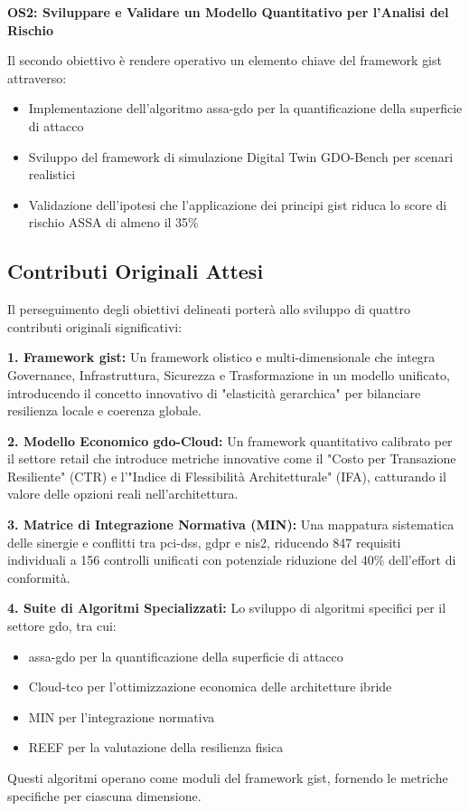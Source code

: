 \textbf{OS2: Sviluppare e Validare un Modello Quantitativo per l'Analisi del Rischio}

Il secondo obiettivo è rendere operativo un elemento chiave del framework \gls{gist} attraverso:
\begin{itemize}
\item Implementazione dell'algoritmo \gls{assa-gdo} per la quantificazione della superficie di attacco
\item Sviluppo del framework di simulazione Digital Twin GDO-Bench per scenari realistici
\item Validazione dell'ipotesi che l'applicazione dei principi \gls{gist} riduca lo score di rischio ASSA di almeno il 35\%
\end{itemize}

\subsection{\texorpdfstring{Contributi Originali Attesi}{1.3.3 - Contributi Originali Attesi}}
\label{subsec:contributi_originali}

Il perseguimento degli obiettivi delineati porterà allo sviluppo di quattro contributi originali significativi:

\textbf{1. Framework \gls{gist}:} Un framework olistico e multi-dimensionale che integra Governance, Infrastruttura, Sicurezza e Trasformazione in un modello unificato, introducendo il concetto innovativo di "elasticità gerarchica" per bilanciare resilienza locale e coerenza globale.

\textbf{2. Modello Economico \gls{gdo}-Cloud:} Un framework quantitativo calibrato per il settore retail che introduce metriche innovative come il "Costo per Transazione Resiliente" (CTR) e l'"Indice di Flessibilità Architetturale" (IFA), catturando il valore delle opzioni reali nell'architettura.

\textbf{3. Matrice di Integrazione Normativa (MIN):} Una mappatura sistematica delle sinergie e conflitti tra \gls{pci-dss}, \gls{gdpr} e \gls{nis2}, riducendo 847 requisiti individuali a 156 controlli unificati con potenziale riduzione del 40\% dell'effort di conformità.

\textbf{4. Suite di Algoritmi Specializzati:} Lo sviluppo di algoritmi specifici per il settore \gls{gdo}, tra cui:
\begin{itemize}
\item \gls{assa-gdo} per la quantificazione della superficie di attacco
\item Cloud-\gls{tco} per l'ottimizzazione economica delle architetture ibride
\item MIN per l'integrazione normativa
\item REEF per la valutazione della resilienza fisica
\end{itemize}
Questi algoritmi operano come moduli del framework \gls{gist}, fornendo le metriche specifiche per ciascuna dimensione.

